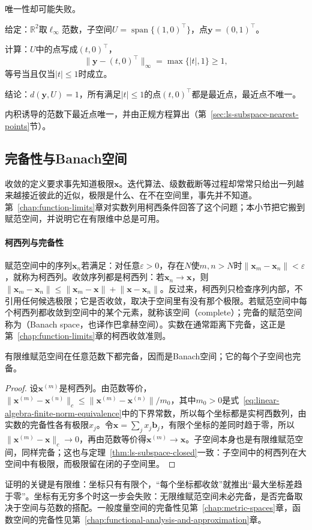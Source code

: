 唯一性却可能失败。
\begin{example}
\label{ex:ls-linf-nonunique-nearest}
给定：$\mathbb R^2$取$\ell_\infty$范数，子空间$U=\operatorname{span}\{(1,0)^\top\}$，点$\bm y=(0,1)^\top$。

计算：$U$中的点写成$(t,0)^\top$，
\[
 \lVert\bm y-(t,0)^\top\rVert_\infty=\max\{|t|,1\}\geq1,
\]
等号当且仅当$|t|\leq1$时成立。

结论：$d(\bm y,U)=1$，所有满足$|t|\leq1$的点$(t,0)^\top$都是最近点，最近点不唯一。
\end{example}
内积诱导的范数下最近点唯一，并由正规方程算出（第~\ref{sec:ls-subspace-nearest-points}节）。

\subsection{完备性与Banach空间}
\label{sec:ls-banach-spaces}

收敛的定义要求事先知道极限$\bm x$。迭代算法、级数截断等过程却常常只给出一列越来越接近彼此的近似，极限是什么、在不在空间里，事先并不知道。第~\ref{chap:function-limits}章对实数列用柯西条件回答了这个问题；本小节把它搬到赋范空间，并说明它在有限维中总是可用。

\paragraph{柯西列与完备性}
赋范空间中的序列$\bm x_n$若满足：对任意$\varepsilon>0$，存在$N$使$m,n>N$时$\lVert\bm x_m-\bm x_n\rVert<\varepsilon$，就称为柯西列。收敛序列都是柯西列：若$\bm x_n\to\bm x$，则$\lVert\bm x_m-\bm x_n\rVert\leq\lVert\bm x_m-\bm x\rVert+\lVert\bm x-\bm x_n\rVert$。反过来，柯西列只检查序列内部，不引用任何候选极限；它是否收敛，取决于空间里有没有那个极限。若赋范空间中每个柯西列都收敛到空间中的某个元素，就称该空间（complete）；完备的赋范空间称为（Banach space，也译作巴拿赫空间）。实数在通常距离下完备，这正是第~\ref{chap:function-limits}章的柯西收敛准则。

\begin{theorem}[有限维赋范空间的完备性]
\label{thm:ls-finite-dimensional-complete}
有限维赋范空间在任意范数下都完备，因而是Banach空间；它的每个子空间也完备。
\end{theorem}
\begin{proof}
设$\bm x^{(m)}$是柯西列。由范数等价，$\lVert\bm x^{(m)}-\bm x^{(n)}\rVert_c\leq\lVert\bm x^{(m)}-\bm x^{(n)}\rVert/m_0$，其中$m_0>0$是式~\eqref{eq:linear-algebra-finite-norm-equivalence}中的下界常数，所以每个坐标都是实柯西数列，由实数的完备性各有极限$x_j$。令$\bm x=\sum_jx_j\bm b_j$，有限个坐标的差同时趋于零，所以$\lVert\bm x^{(m)}-\bm x\rVert_c\to0$，再由范数等价得$\bm x^{(m)}\to\bm x$。子空间本身也是有限维赋范空间，同样完备；这也与定理~\ref{thm:ls-subspace-closed}一致：子空间中的柯西列在大空间中有极限，而极限留在闭的子空间里。
\end{proof}
证明的关键是有限维：坐标只有有限个，“每个坐标都收敛”就推出“最大坐标差趋于零”。坐标有无穷多个时这一步会失败：无限维赋范空间未必完备，是否完备取决于空间与范数的搭配。一般度量空间的完备性见第~\ref{chap:metric-spaces}章，函数空间的完备性见第~\ref{chap:functional-analysis-and-approximation}章。

